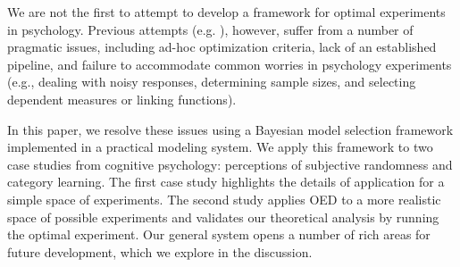 \documentclass{article}
\newcommand{\ndg}[1]{\textcolor{Green}{[ndg: #1]}}
\begin{document}

We are not the first to attempt to develop a framework for optimal experiments in psychology.
Previous attempts (e.g. \cite{Myung2009}), however, suffer from a number of pragmatic issues, including ad-hoc optimization criteria, lack of an established pipeline, and failure to accommodate common worries in psychology experiments (e.g., dealing with noisy responses, determining sample sizes, and selecting dependent measures or linking functions).

In this paper, we resolve these issues using a Bayesian model selection framework implemented in a practical modeling system.
We apply this framework to two case studies from cognitive psychology: perceptions of subjective randomness and category learning.
The first case study highlights the details of application for a simple space of experiments.
The second study applies OED to a more realistic space of possible experiments and validates our theoretical analysis by running the optimal experiment.
Our general system opens a number of rich areas for future development, which we explore in the discussion.

\end{document}
